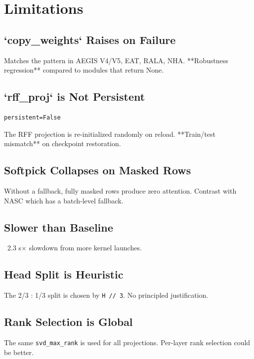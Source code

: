
\section{Limitations}

\subsection{`copy\_weights` Raises on Failure}

Matches the pattern in AEGIS V4/V5, EAT, RALA, NHA. **Robustness 
regression** compared to modules that return None.

\subsection{`rff\_proj` is Not Persistent}

\begin{lstlisting}
persistent=False
\end{lstlisting}

The RFF projection is re-initialized randomly on reload. **Train/test 
mismatch** on checkpoint restoration.

\subsection{Softpick Collapses on Masked Rows}

Without a fallback, fully masked rows produce zero attention. Contrast 
with NASC which has a batch-level fallback.

\subsection{Slower than Baseline}

~2.3 s$\times$ slowdown from more kernel launches.

\subsection{Head Split is Heuristic}

The 2/3 : 1/3 split is chosen by \texttt{H // 3}. No principled justification.

\subsection{Rank Selection is Global}

The same \texttt{svd\_max\_rank} is used for all projections. Per-layer rank 
selection could be better.

